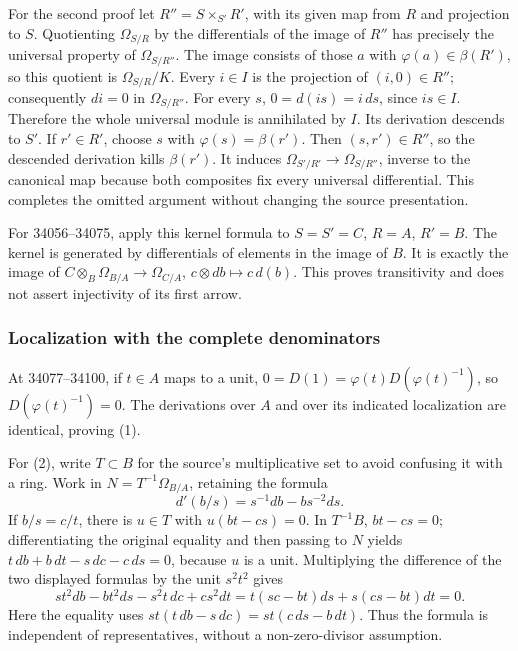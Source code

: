 For the second proof let \(R''=S\times_{S'}R'\), with its given map from \(R\) and projection to \(S\). Quotienting \(\Omega_{S/R}\) by the differentials of the image of \(R''\) has precisely the universal property of \(\Omega_{S/R''}\). The image consists of those \(a\) with \(\varphi(a)\in\beta(R')\), so this quotient is \(\Omega_{S/R}/K\). Every \(i\in I\) is the projection of \((i,0)\in R''\); consequently \(di=0\) in \(\Omega_{S/R''}\). For every \(s\), \(0=d(is)=i\,ds\), since \(is\in I\). Therefore the whole universal module is annihilated by \(I\). Its derivation descends to \(S'\). If \(r'\in R'\), choose \(s\) with \(\varphi(s)=\beta(r')\). Then \((s,r')\in R''\), so the descended derivation kills \(\beta(r')\). It induces \(\Omega_{S'/R'}\to\Omega_{S/R''}\), inverse to the canonical map because both composites fix every universal differential. This completes the omitted argument without changing the source presentation.

For 34056--34075, apply this kernel formula to \(S=S'=C\), \(R=A\), \(R'=B\). The kernel is generated by differentials of elements in the image of \(B\). It is exactly the image of \(C\otimes_B\Omega_{B/A}\to\Omega_{C/A}\), \(c\otimes db\mapsto c\,d(b)\). This proves transitivity and does not assert injectivity of its first arrow.

\subsubsection{Localization with the complete denominators}\label{algebra-proof-041-localization-with-the-complete-denominators}

At 34077--34100, if \(t\in A\) maps to a unit, \(0=D(1)=\varphi(t)D(\varphi(t)^{-1})\), so \(D(\varphi(t)^{-1})=0\). The derivations over \(A\) and over its indicated localization are identical, proving (1).

For (2), write \(T\subset B\) for the source's multiplicative set to avoid confusing it with a ring. Work in \(N=T^{-1}\Omega_{B/A}\), retaining the formula \[
d'(b/s)=s^{-1}db-bs^{-2}ds.
\] If \(b/s=c/t\), there is \(u\in T\) with \(u(bt-cs)=0\). In \(T^{-1}B\), \(bt-cs=0\); differentiating the original equality and then passing to \(N\) yields \(t\,db+b\,dt-s\,dc-c\,ds=0\), because \(u\) is a unit. Multiplying the difference of the two displayed formulas by the unit \(s^2t^2\) gives \[
st^2db-bt^2ds-s^2t\,dc+cs^2dt
=t(sc-bt)ds+s(cs-bt)dt=0.
\] Here the equality uses \(st(t\,db-s\,dc)=st(c\,ds-b\,dt)\). Thus the formula is independent of representatives, without a non-zero-divisor assumption.

